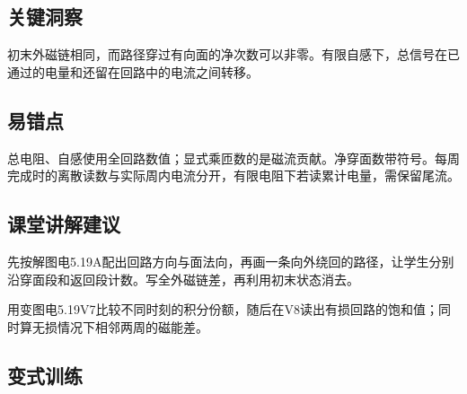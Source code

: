 \documentclass[UTF8,fontset=fandol,a4paper,11pt]{ctexart}
\begin{document}
\subsection*{关键洞察}

初末外磁链相同，而路径穿过有向面的净次数可以非零。有限自感下，总信号在已通过的电量和还留在回路中的电流之间转移。



\subsection*{易错点}

总电阻、自感使用全回路数值；显式乘匝数的是磁流贡献。净穿面数带符号。每周完成时的离散读数与实际周内电流分开，有限电阻下若读累计电量，需保留尾流。



\subsection*{课堂讲解建议}

先按解图电5.19A配出回路方向与面法向，再画一条向外绕回的路径，让学生分别沿穿面段和返回段计数。写全外磁链差，再利用初末状态消去。

用变图电5.19V7比较不同时刻的积分份额，随后在V8读出有损回路的饱和值；同时算无损情况下相邻两周的磁能差。


\subsection*{变式训练}
\end{document}
